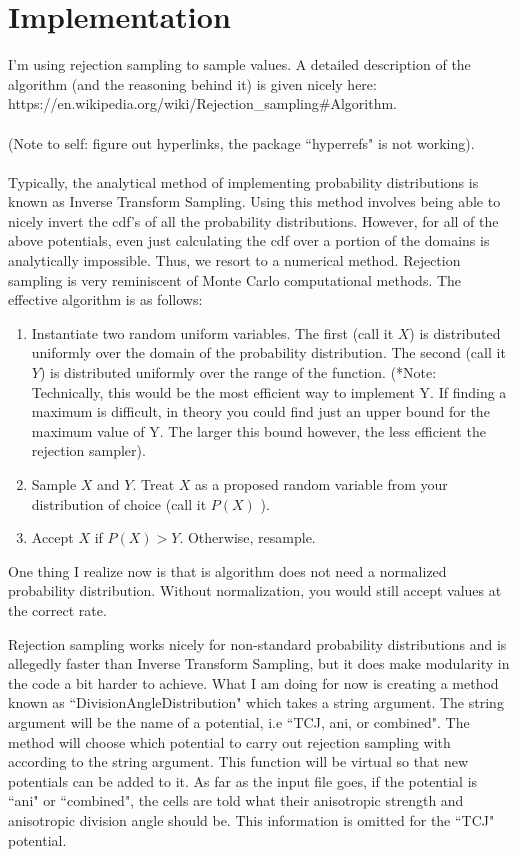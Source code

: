 \documentclass[12pt]{article}
\begin{document}
\section{Implementation}
\label{mod}
I'm using rejection sampling to sample values. 
A detailed description of the algorithm (and the reasoning behind it) is given nicely here:\\ https://en.wikipedia.org/wiki/Rejection\_sampling\#Algorithm. \\ \\
(Note to self: figure out hyperlinks, the package ``hyperrefs" is not working). \\ \\
Typically, the analytical method of implementing probability distributions is known as Inverse Transform Sampling. Using this method involves being able to nicely invert the cdf's of all the probability distributions. However, for all of the above potentials, even just calculating the cdf over a portion of the domains is analytically impossible. Thus, we resort to a numerical method. Rejection sampling is very reminiscent of Monte Carlo computational methods. The effective algorithm is as follows:
\begin{enumerate}
\item Instantiate two random uniform variables. The first (call it $X$) is distributed uniformly over the domain of the probability distribution. The second (call it $Y$) is distributed uniformly over the range of the function. (*Note: Technically, this would be the most efficient way to implement Y. If finding a maximum is difficult, in theory you could find just an upper bound for the maximum value of Y. The larger this bound however, the less efficient the rejection sampler). 
\item Sample $X$ and $Y$. Treat $X$ as a proposed random variable from your distribution of choice (call it $P(X)$ ).

\item Accept $X$ if $P(X) > Y$. Otherwise, resample. 
\end{enumerate}
One thing I realize now is that is algorithm does not need a normalized probability distribution. Without normalization, you would still accept values at the correct rate.

Rejection sampling works nicely for non-standard probability distributions and is allegedly faster than Inverse Transform Sampling, but it does make modularity in the code a bit harder to achieve. What I am doing for now is creating a method known as ``DivisionAngleDistribution" which takes a string argument. The string argument will be the name of a potential, i.e ``TCJ, ani, or combined". The method will choose which potential to carry out rejection sampling with according to the string argument. This function will be virtual so that new potentials can be added to it. As far as the input file goes, if the potential is ``ani" or ``combined", the cells are told what their anisotropic strength and anisotropic division angle should be. This information is omitted for the ``TCJ" potential. 
\end{document}
